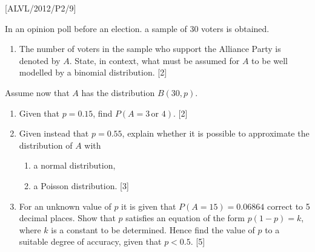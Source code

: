 \item {[}ALVL/2012/P2/9{]}

In an opinion poll before an election. a sample of 30 voters is obtained. 
\begin{enumerate}
\item The number of voters in the sample who support the Alliance Party
is denoted by $A$. State, in context, what must be assumed for $A$
to be well modelled by a binomial distribution. {[}2{]} 
\end{enumerate}
Assume now that $A$ has the distribution $B\left(30,p\right)$. 
\begin{enumerate}
\item Given that $p=0.15$, find $P\left(A=3\,\text{or }4\right)$. {[}2{]} 
\item Given instead that $p=0.55$, explain whether it is possible to approximate
the distribution of $A$ with 
\begin{enumerate}
\item a normal distribution, 
\item a Poisson distribution. {[}3{]} 
\end{enumerate}
\item For an unknown value of $p$ it is given that $P\left(A=15\right)=0.06864$
correct to 5 decimal places. Show that $p$ satisfies an equation
of the form $p\left(1-p\right)=k$, where $k$ is a constant to be
determined. Hence find the value of $p$ to a suitable degree of accuracy,
given that $p<0.5$. {[}5{]}
\end{enumerate}
